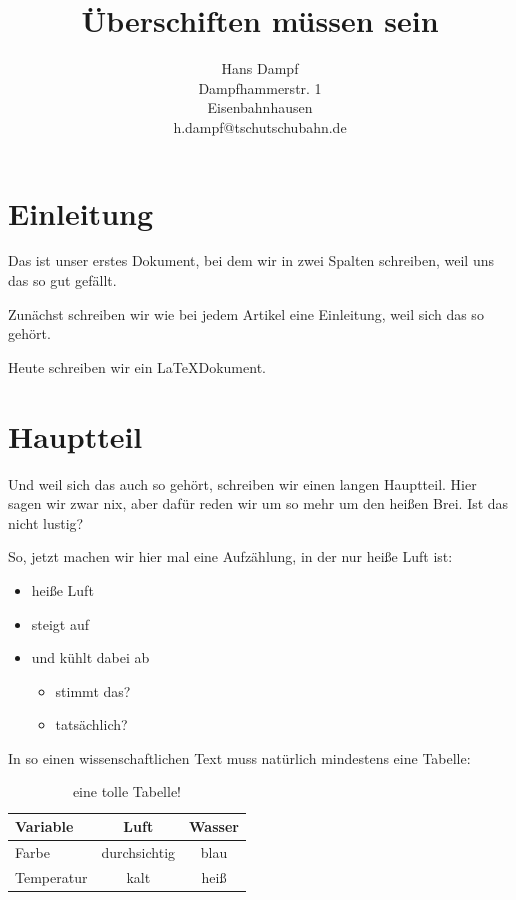 \documentclass[paper=a4,
			   fontsize=12pt,
			   twocolumn=true
			   ]{scrartcl}
\begin{document}
	
	\title{Überschiften müssen sein}
	\author{Hans Dampf \\ Dampfhammerstr. 1 \\ Eisenbahnhausen \\ h.dampf@tschutschubahn.de}
	
	\maketitle
	
	
	
	
	\section{Einleitung}
	
	Das ist unser erstes Dokument, bei dem wir in zwei Spalten schreiben, weil uns das so gut gefällt.
	
	Zunächst schreiben wir wie bei jedem Artikel eine Einleitung, weil sich das so gehört.
	
	Heute schreiben wir ein \LaTeX Dokument.
	
	\section{Hauptteil}
	
	Und weil sich das auch so gehört, schreiben wir einen langen Hauptteil. Hier sagen wir zwar nix, aber dafür reden wir um so mehr um den heißen Brei. Ist das nicht lustig?
	
	So, jetzt machen wir hier mal eine Aufzählung, in der nur heiße Luft ist:
	\begin{itemize}
		\item heiße Luft
		\item steigt auf
		\item und kühlt dabei ab
		\begin{itemize}
			\item stimmt das?
			\item tatsächlich?
		\end{itemize}
	\end{itemize}
	
	In so einen wissenschaftlichen Text muss natürlich mindestens eine Tabelle:\\

	
	\begin{table}
	\begin{tabular}{lcc}
			\toprule 
			Variable & Luft & Wasser \\
			\midrule
			Farbe & durchsichtig & blau\\
			Temperatur & kalt & heiß \\
			\bottomrule
			
		\end{tabular} \\
		\caption{eine tolle Tabelle!}
		\end{table}
\end{document}
